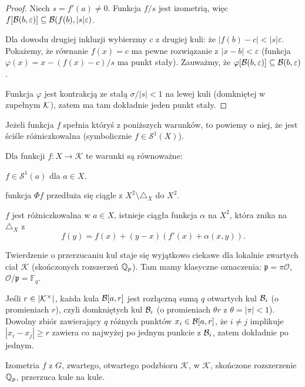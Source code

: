 \begin{proof}
	Niech $s = f'(a) \neq 0$.
	Funkcja $f / s$ jest izometrią, więc $f[\mathcal B(b, \varepsilon)] \subseteq \mathcal B(f(b), |s| \varepsilon)$.

	Dla dowodu drugiej inkluzji wybierzmy $c$ z drugiej kuli: że $|f(b) - c| < |s| \varepsilon$.
	Pokażemy, że równanie $f(x) = c$ ma pewne rozwiązanie z $|x - b| < \varepsilon$ (funkcja $\varphi(x) = x - (f(x) - c) / s$ ma punkt stały).
	Zauważmy, że $\varphi[\mathcal B(b, \varepsilon)] \subseteq \mathcal B(b, \varepsilon)$.

	Funkcja $\varphi$ jest kontrakcją ze stałą $\sigma/|s| < 1$ na lewej kuli (domkniętej w zupełnym $\mathcal K$), zatem ma tam dokładnie jeden punkt stały.
\end{proof}

Jeżeli funkcja $f$ spełnia któryś z poniższych warunków, to powiemy o niej, że jest {ściśle różniczkowalna} (symbolicznie $f \in \mathcal S^1(X)$).

\begin{fakt}
	Dla funkcji $f \colon X \to \mathcal K$ te warunki są równoważne:
	\begin{enumx}
		\item $f \in \mathcal S^1(a)$ dla $a \in X$.
		\item funkcja $\Phi f$ przedłuża się ciągle z $X^2 \setminus \triangle_X$ do $X^2$.
		\item $f$ jest różniczkowalna w $a \in X$, istnieje ciągła funkcja $\alpha$ na $X^2$, która znika na $\triangle_X$ z
		\[
			f(y) = f(x) + (y-x) (f'(x) + \alpha(x,y)).
		\]
	\end{enumx}
\end{fakt}

Twierdzenie o przerzucaniu kul staje się wyjątkowo ciekawe dla lokalnie zwartych ciał $\mathcal K$ (skończonych rozszerzeń $\mathbb Q_p$).
Tam mamy klasyczne oznaczenia: $\mathfrak p = \pi \mathcal O$, $\mathcal O/\mathfrak p = \mathbb F_q$.

Jeśli $r \in |\mathcal K^\times|$, każda kula $\mathcal B[a, r]$ jest rozłączną sumą $q$ otwartych kul $\mathcal B_i$ (o promieniach $r$), czyli domkniętych kul $\mathcal B_i$ (o promieniach $\theta r$ z $\theta = |\pi| < 1$).
Dowolny zbiór zawierający $q$ różnych punktów $x_i \in \mathcal B[a, r]$, że $i \neq j$ implikuje $|x_i - x_j| \ge r$ zawiera co najwyżej po jednym punkcie z $\mathcal B_i$, zatem dokładnie po jednym.

\begin{fakt} \label{exinferius}
	Izometria  $f$ z $G$, zwartego, otwartego podzbioru $\mathcal K$, w $\mathcal K$, skończone rozszerzenie $\mathbb Q_p$, przerzuca kule na kule.
\end{fakt}

